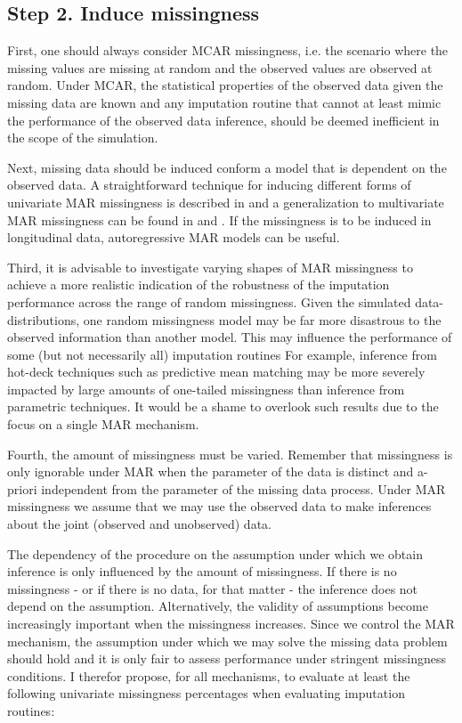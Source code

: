 \documentclass[bimj,fleqn]{w-art}
\begin{document}
\subsection{Step 2. Induce missingness}

First, one should always consider MCAR missingness, i.e. the scenario where the missing values are missing at random and the observed values are observed at random. Under MCAR, the statistical properties of the observed data given the missing data are known and any imputation routine that cannot at least mimic the performance of the observed data inference, should be deemed inefficient in the scope of the simulation.  

Next, missing data should be induced conform a model that is dependent on the observed data. A straightforward technique for inducing different forms of univariate MAR missingness is described in \citet[][p. 63]{fimd} and a generalization to multivariate MAR missingness can be found in \citet[][Appendix B]{buur06} and \citet[][\S 5.2.3]{brand1999development}. If the missingness is to be induced in longitudinal data, autoregressive MAR models \citep[e.g. cf.][model 2 and model 3]{shara2015randomly} can be useful. 

Third, it is advisable to investigate varying shapes of MAR missingness to achieve a more realistic indication of the robustness of the imputation performance across the range of random missingness. Given the simulated data-distributions, one random missingness model may be far more disastrous to the observed information than another model. This may influence the performance of some (but not necessarily all) imputation routines For example, inference from  hot-deck techniques such as predictive mean matching \citep{little1988missing, rubin1986statistical} may be more severely impacted by large amounts of one-tailed missingness than inference from parametric techniques. It would be a shame to overlook such results due to the focus on a single MAR mechanism. 

Fourth, the amount of missingness must be varied. Remember that missingness is only ignorable under MAR when the parameter of the data is distinct and a-priori independent from the parameter of the missing data process. Under MAR missingness we assume that we may use the observed data to make inferences about the joint (observed and unobserved) data. 

The dependency of the procedure on the assumption under which we obtain inference is only influenced by the amount of missingness. If there is no missingness - or if there is no data, for that matter - the inference does not depend on the assumption. Alternatively, the validity of assumptions become increasingly important when the missingness increases. Since we control the MAR mechanism, the assumption under which we may solve the missing data problem should hold and it is only fair to assess performance under stringent missingness conditions. I therefor propose, for all mechanisms, to evaluate at least the following univariate missingness percentages when evaluating imputation routines:
\end{document}
